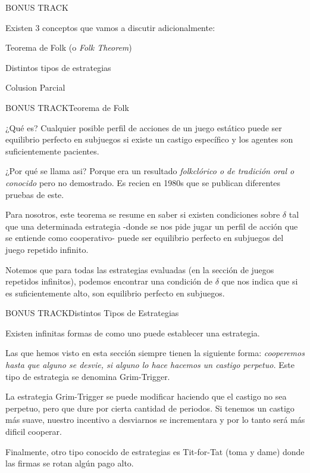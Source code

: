 \documentclass[notes, 11pt]{beamer} %
\newenvironment{wideitemize}{\itemize\addtolength{\itemsep}{10pt}}{\enditemize}
\begin{document}
\iffalse

\begin{frame}{BONUS TRACK}
\begin{wideitemize}
	\item<1-> Existen 3 conceptos que vamos a discutir adicionalmente:
	\begin{wideitemize}
		\item<2->[--] Teorema de Folk (o \textit{Folk Theorem})
		\item<3->[--] Distintos tipos de estrategias
		\item<4->[--] Colusion Parcial
	\end{wideitemize}
\end{wideitemize}
\end{frame}

\begin{frame}{BONUS TRACK}{Teorema de Folk}
\begin{wideitemize}
	\item<1-> ¿Qu\'e es? Cualquier posible perfil de acciones de un juego est\'atico puede ser equilibrio perfecto en subjuegos si existe un castigo espec\'ifico y los agentes son suficientemente pacientes.
	\item<2-> ¿Por qu\'e se llama asi? Porque era un resultado \textit{folkcl\'orico o de tradici\'on oral o conocido} pero no demostrado. Es recien en 1980s que se publican diferentes pruebas de este.
	\item<3-> Para nosotros, este teorema se resume en saber si existen condiciones sobre $\delta$ tal que una determinada estrategia -donde se nos pide jugar un perfil de acci\'on que se entiende como cooperativo- puede ser equilibrio perfecto en subjuegos del juego repetido infinito.
	\item<4-> Notemos que para todas las estrategias evaluadas (en la secci\'on de juegos repetidos infinitos), podemos encontrar una condici\'on de $\delta$ que nos indica que si es suficientemente alto, son equilibrio perfecto en subjuegos.
\end{wideitemize}
\end{frame}

\begin{frame}{BONUS TRACK}{Distintos Tipos de Estrategias}
\begin{wideitemize}
	\item<1-> Existen infinitas formas de como uno puede establecer una estrategia.
	\item<2-> Las que hemos visto en esta secci\'on siempre tienen la siguiente forma: \textit{cooperemos hasta que alguno se desvie, si alguno lo hace hacemos un castigo perpetuo.} Este tipo de estrategia se denomina Grim-Trigger.
	\item<3-> La estrategia Grim-Trigger se puede modificar haciendo que el castigo no sea perpetuo, pero que dure por cierta cantidad de periodos. Si tenemos un castigo m\'as suave, nuestro incentivo a desviarnos se incrementara y por lo tanto ser\'a m\'as dificil cooperar.
	\item<4-> Finalmente, otro tipo conocido de estrategias es Tit-for-Tat (toma y dame) donde las firmas se rotan alg\'un pago alto. 
\end{wideitemize}
\end{frame}
\end{document}
